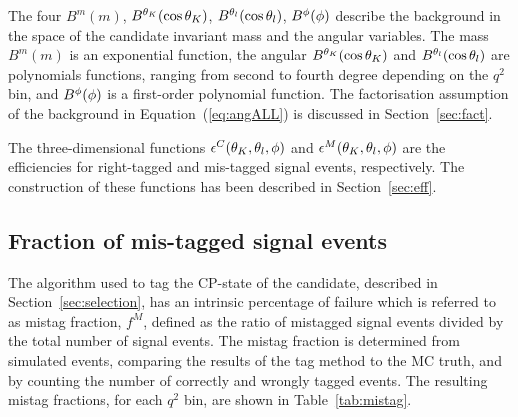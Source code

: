 The four \pdfs $B^m(m)$, $B^{\theta_K}(\cos\theta_K)$, $B^{\theta_l}(\cos\theta_l)$, $B^{\phi}(\phi)$ describe the background in the space of the \PBz candidate invariant mass and the angular variables.
The mass \pdf $B^m(m)$ is an exponential function, the angular \pdfs $B^{\theta_K}(\cos\theta_K)$ and $B^{\theta_l}(\cos\theta_l)$ are polynomials functions, ranging from second to fourth degree depending on the $q^2$ bin, and $B^{\phi}(\phi)$ is a first-order polynomial function.
The factorisation assumption of the background \pdf in Equation~(\ref{eq:angALL}) is discussed in Section~\ref{sec:fact}.

The three-dimensional functions $\epsilon^{C}(\theta_K,\theta_l,\phi)$ and $\epsilon^{M}(\theta_K,\theta_l,\phi)$ are the efficiencies for right-tagged and mis-tagged signal events, respectively.
The construction of these functions has been described in Section~\ref{sec:eff}.

\subsection{Fraction of mis-tagged signal events}
\label{sec:mistag}


The algorithm used to tag the CP-state of the \PBz candidate, described in Section~\ref{sec:selection}, has an intrinsic percentage of failure which is referred to as mistag fraction, $f^M$, defined as the ratio of mistagged signal events divided by the total number of signal events.
The mistag fraction is determined from simulated events, comparing the results of the tag method to the MC truth, and by counting the number of correctly and wrongly tagged events.
The resulting mistag fractions, for each $q^2$ bin, are shown in Table~\ref{tab:mistag}.

